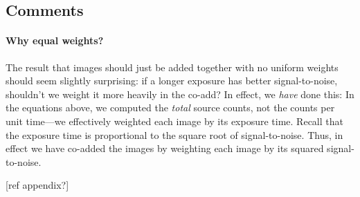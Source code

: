 \documentclass[letterpaper,preprint]{aastex}
\newcommand{\drawnfrom}{\sim}
\newcommand{\gaussianN}{\mathcal{N}}
\newcommand{\gaussian}[1]{\gaussianN\!\left(#1\right)}
\newcommand{\snr}[1]{\mathbb{SN}(#1)}
\newcommand{\sky}{\mathrm{sky}}
\newcommand{\commentout}[1]{}
\begin{document}
\subsection{Comments}

\paragraph{Why equal weights?}
The result that images should just be added together with no uniform
weights should seem slightly surprising: if a longer exposure has
better signal-to-noise, shouldn't we weight it more heavily in the
co-add?  In effect, we \emph{have} done this: In the equations above,
we computed the \emph{total} source counts, not the counts per unit
time---we effectively weighted each image by its exposure time.
Recall that the exposure time is proportional to the square root of
signal-to-noise.  Thus, in effect we have co-added the images by
weighting each image by its squared signal-to-noise.

[ref appendix?]
\commentout{
To see this, again consider the case of combining two images, but
before doing so, let us convert the images to ``rate images'',
measured in units of counts per unit time:
\begin{equation} R_1 = I_1 / t_1 \qquad \mathrm{and} \qquad R_2 = I_2 / t_2 \quad . \end{equation}
We then get:
\begin{eqnarray}
  R &=& \alpha R_1 + (1 - \alpha) R_2 \\
  &=& \alpha \frac{I_1}{t_1} + (1 - \alpha) \frac{I_2}{t_2} \\
  &\drawnfrom& \frac{\alpha}{t_1} \gaussian{f t_1, \sky t_1} + \frac{1 - \alpha}{t_2} \gaussian{f t_2, \sky t_2} \\
  &\drawnfrom& \alpha \gaussian{f, \frac{\sky}{t_1}} + (1 - \alpha) \gaussian{f, \frac{\sky}{t_2}} \\
  &\drawnfrom& \gaussian{f, \frac{\alpha^2 \sky}{t_1} + \frac{(1 - \alpha)^2 \sky}{t_2}}
\end{eqnarray}
which has signal-to-noise
\begin{eqnarray}
\snr{R} &=& \frac{f}{\sqrt{\frac{\alpha^2 \sky}{t_1} + \frac{(1-\alpha)^2 \sky}{t_2}}} \\
\end{eqnarray}
which is optimized at
\begin{equation}
\alpha = \frac{t_1}{t_1 + t_2} \quad .
\label{eqn:snexptime}
\end{equation}
In other words, we must weight the rate images by their exposure
times, which is equivalent to their squared signal-to-noise.
}
\end{document}
